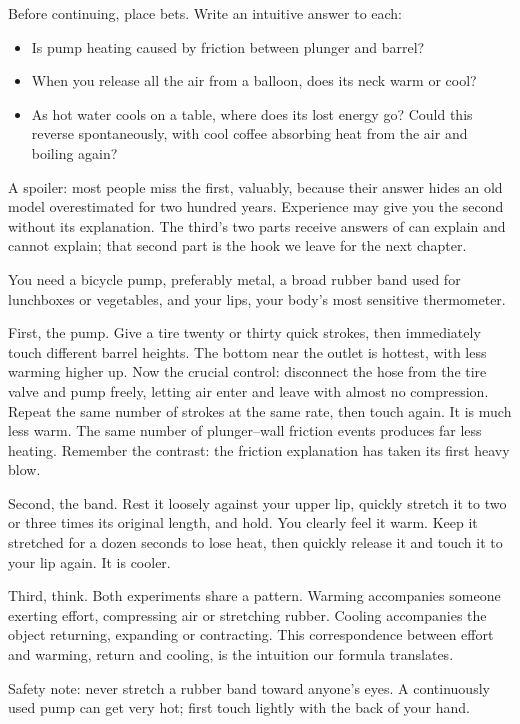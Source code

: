 \begin{mainline}
Before continuing, place bets. Write an intuitive answer to each:

\begin{itemize}
  \item Is pump heating caused by friction between plunger and barrel?
  \item When you release all the air from a balloon, does its neck warm or cool?
  \item As hot water cools on a table, where does its lost energy go? Could this reverse spontaneously, with cool coffee absorbing heat from the air and boiling again?
\end{itemize}

A spoiler: most people miss the first, valuably, because their answer hides an old model overestimated for two hundred years. Experience may give you the second without its explanation. The third's two parts receive answers of can explain and cannot explain; that second part is the hook we leave for the next chapter.
\end{mainline}


\begin{experiment}
You need a bicycle pump, preferably metal, a broad rubber band used for lunchboxes or vegetables, and your lips, your body's most sensitive thermometer.

First, the pump. Give a tire twenty or thirty quick strokes, then immediately touch different barrel heights. The bottom near the outlet is hottest, with less warming higher up. Now the crucial control: disconnect the hose from the tire valve and pump freely, letting air enter and leave with almost no compression. Repeat the same number of strokes at the same rate, then touch again. It is much less warm. The same number of plunger--wall friction events produces far less heating. Remember the contrast: the friction explanation has taken its first heavy blow.

Second, the band. Rest it loosely against your upper lip, quickly stretch it to two or three times its original length, and hold. You clearly feel it warm. Keep it stretched for a dozen seconds to lose heat, then quickly release it and touch it to your lip again. It is cooler.

Third, think. Both experiments share a pattern. Warming accompanies someone exerting effort, compressing air or stretching rubber. Cooling accompanies the object returning, expanding or contracting. This correspondence between effort and warming, return and cooling, is the intuition our formula translates.

Safety note: never stretch a rubber band toward anyone's eyes. A continuously used pump can get very hot; first touch lightly with the back of your hand.
\end{experiment}

